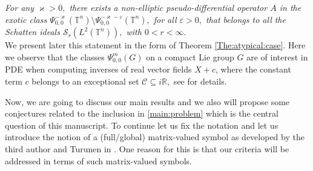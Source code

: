 \documentclass[12pt, reqno]{amsart}
\theoremstyle{definition}
\theoremstyle{remark}
\numberwithin{equation}{section}
\begin{document}
\noindent {\bf $\bullet$} {\it For any $\varkappa>0,$ there exists a {non-elliptic} pseudo-differential operator $A$ in the exotic class  $\Psi^{-\varkappa}_{0,0}(\mathbb{T}^n
)\setminus \Psi^{-\varkappa-\varepsilon}_{0,0}(\mathbb{T}^n
), $ for all $\varepsilon>0,$ that belongs to all the Schatten ideals $\mathscr{S}_r(L^2(\mathbb{T}^n)),$ with $0<r<\infty.$ }
\\[2ex]
We present later this statement  in the form of Theorem \ref{The:atypical:case}.
Here we observe that the classes $\Psi_{0,0}^{m}(G)$ on a compact Lie group $G$ are of interest in PDE when computing inverses of real vector fields $X+c$, where the constant term $c$ belongs to an exceptional set $\mathscr{C}\subseteq i\mathbb{R},$ see \cite[Page 627]{RuzhanskyWirth2015} for details.
%
%


Now, we are going to discuss our main results  and we also will propose some conjectures related to the inclusion in \eqref{main:problem} which is the central  question of this manuscript. 
To continue  let us fix the notation and let us introduce the notion of a (full/global) matrix-valued symbol as developed by the third author and Turunen in \cite{Ruz}. One reason for this is that our criteria will be addressed in terms of such matrix-valued symbols. 
\end{document}
